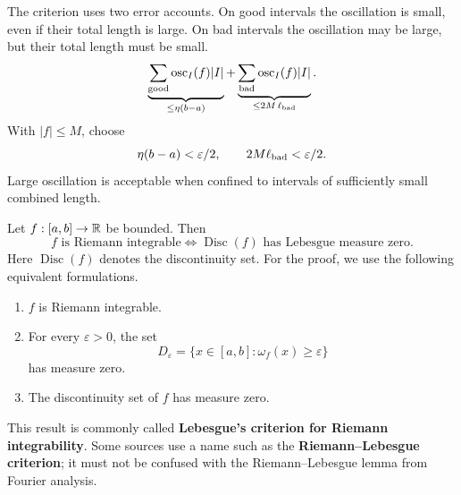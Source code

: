 The criterion uses two error accounts. On good intervals the oscillation
is small, even if their total length is large. On bad intervals the
oscillation may be large, but their total length must be small.
\[
\underbrace{\sum_{\rm good}\operatorname{osc}_I(f)|I|}_{\leq\eta(b-a)}
+\underbrace{\sum_{\rm bad}\operatorname{osc}_I(f)|I|}_{\leq2M\,\ell_{\rm bad}}.
\]
With $|f|\leq M$, choose
\[
\eta(b-a)<\varepsilon/2,\qquad 2M\ell_{\rm bad}<\varepsilon/2.
\]
 Large oscillation is acceptable when
confined to intervals of sufficiently small combined length.
\begin{center}
\end{center}
\begin{theorem}
\label{thm:riemann-lebesgue-criterion}
Let $f:[a,b]\to\mathbb{R}$ be bounded. Then
\[
\boxed{f\text{ is Riemann integrable}
\iff \operatorname{Disc}(f)\text{ has Lebesgue measure zero}.}
\]
Here $\operatorname{Disc}(f)$ denotes the discontinuity set. For the proof,
we use the following equivalent formulations.
\begin{enumerate}
\item $f$ is Riemann integrable.
\item For every $\varepsilon>0$, the set
\[
D_{\varepsilon}=\bigl\{x\in[a,b]:\omega_f(x)\geq\varepsilon\bigr\}
\]
has measure zero.
\item The discontinuity set of $f$ has measure zero.
\end{enumerate}
\end{theorem}
\begin{remark}[Terminology]
This result is commonly called \textbf{Lebesgue's criterion for Riemann
integrability}.  Some sources use a name such as the
\textbf{Riemann--Lebesgue criterion}; it must not be confused with the
Riemann--Lebesgue lemma from Fourier analysis.
\end{remark}
